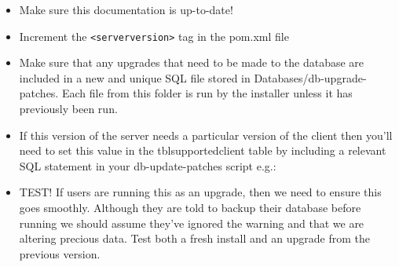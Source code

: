 \begin{itemize}
 \item Make sure this documentation is up-to-date! 
 \item Increment the \verb|<serverversion>| tag in the pom.xml file
 \item Make sure that any upgrades that need to be made to the database are included in a new and unique SQL file stored in Databases/db-upgrade-patches.  Each file from this folder is run by the installer unless it has previously been run.  
 \item If this version of the server needs a particular version of the client then you'll need to set this value in the tblsupportedclient table by including a relevant SQL statement in your db-update-patches script e.g.: 
 \item TEST!  If users are running this as an upgrade, then we need to ensure this goes smoothly.  Although they are told to backup their database before running we should assume they've ignored the warning and that we are altering precious data. Test both a fresh install and an upgrade from the previous version.
\end{itemize}




